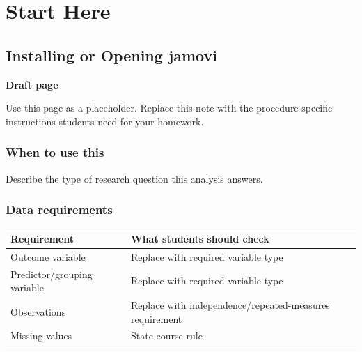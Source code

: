 \documentclass[
  letterpaper,
  DIV=11,
  numbers=noendperiod]{scrreprt}
\newcounter{none} %
\begin{document}
\part{Start Here}

\chapter{Installing or Opening
jamovi}\label{installing-or-opening-jamovi}

\begin{tcolorbox}[enhanced jigsaw, arc=.35mm, bottomrule=.15mm, breakable, colback=white, colframe=quarto-callout-note-color-frame, left=2mm, leftrule=.75mm, opacityback=0, rightrule=.15mm, toprule=.15mm]
\begin{minipage}[t]{5.5mm}
\textcolor{quarto-callout-note-color}{\faInfo}
\end{minipage}%
\begin{minipage}[t]{\textwidth - 5.5mm}

\vspace{-3mm}\textbf{Draft page}\vspace{3mm}

Use this page as a placeholder. Replace this note with the
procedure-specific instructions students need for your homework.

\end{minipage}%
\end{tcolorbox}

\section{When to use this}\label{when-to-use-this}

Describe the type of research question this analysis answers.

\section{Data requirements}\label{data-requirements}

{\def\LTcaptype{none} %
\begin{longtable}[]{@{}
  >{\raggedright\arraybackslash}p{}
  >{\raggedright\arraybackslash}p{}@{}}
\toprule\noalign{}
\begin{minipage}[b]{\linewidth}\raggedright
Requirement
\end{minipage} & \begin{minipage}[b]{\linewidth}\raggedright
What students should check
\end{minipage} \\
\midrule\noalign{}
\endhead
\bottomrule\noalign{}
\endlastfoot
Outcome variable & Replace with required variable type \\
Predictor/grouping variable & Replace with required variable type \\
Observations & Replace with independence/repeated-measures
requirement \\
Missing values & State course rule \\
\end{longtable}
}
\end{document}
